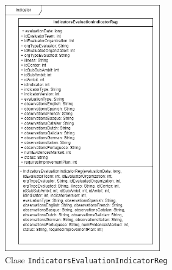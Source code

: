 \begin{itemize}
    \begin{figure}[H]
		\centering
		\includegraphics[width=0.6\textwidth]{./Figuras/Diagramas/IndicatorsEvaluationIndicatorReg.png}
		\caption{Clase \texttt{IndicatorsEvaluationIndicatorReg}}\label{fig:./Figuras/Diagramas/IndicatorsEvaluationIndicatorReg.png}
	\end{figure}


\end{itemize}
